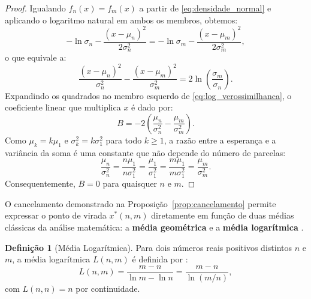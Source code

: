 \documentclass[11pt,a4paper]{article}
\theoremstyle{definition}
\newtheorem{definition}[theorem]{Definição}
\theoremstyle{remark}
\begin{document}
\begin{proof}
Igualando $f_n(x) = f_m(x)$ a partir de \eqref{eq:densidade_normal} e aplicando o logaritmo natural em ambos os membros, obtemos:
\[
-\ln \sigma_n - \frac{(x - \mu_n)^2}{2\sigma_n^2} = -\ln \sigma_m - \frac{(x - \mu_m)^2}{2\sigma_m^2},
\]
o que equivale a:
\begin{equation}
\frac{(x - \mu_n)^2}{\sigma_n^2} - \frac{(x - \mu_m)^2}{\sigma_m^2} = 2 \ln\!\left(\frac{\sigma_m}{\sigma_n}\right).
\label{eq:log_verossimilhanca}
\end{equation}
Expandindo os quadrados no membro esquerdo de \eqref{eq:log_verossimilhanca}, o coeficiente linear que multiplica $x$ é dado por:
\[
B = -2\left(\frac{\mu_n}{\sigma_n^2} - \frac{\mu_m}{\sigma_m^2}\right).
\]
Como $\mu_k = k\mu_1$ e $\sigma_k^2 = k\sigma_1^2$ para todo $k \ge 1$, a razão entre a esperança e a variância da soma é uma constante que não depende do número de parcelas:
\begin{equation}
\frac{\mu_n}{\sigma_n^2} = \frac{n\mu_1}{n\sigma_1^2} = \frac{\mu_1}{\sigma_1^2} = \frac{m\mu_1}{m\sigma_1^2} = \frac{\mu_m}{\sigma_m^2}.
\end{equation}
Consequentemente, $B = 0$ para quaisquer $n$ e $m$.
\end{proof}

O cancelamento demonstrado na Proposição~\ref{prop:cancelamento} permite expressar o ponto de virada $x^*(n,m)$ diretamente em função de duas médias clássicas da análise matemática: a \textbf{média geométrica} e a \textbf{média logarítmica} \cite{carlson1972,lin1974}.

\begin{definition}[Média Logarítmica]
Para dois números reais positivos distintos $n$ e $m$, a média logarítmica $L(n,m)$ é definida por \cite{carlson1972}:
\begin{equation}
L(n, m) = \frac{m - n}{\ln m - \ln n} = \frac{m - n}{\ln(m/n)},
\label{eq:media_logaritmica}
\end{equation}
com $L(n, n) = n$ por continuidade.
\end{definition}
\end{document}

